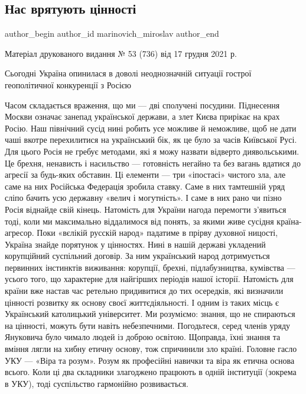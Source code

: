  
 
 
 
 
\subsection{Нас врятують цінності}
\label{sec:31_12_2021.stz.news.ua.tyzhden.1.cennosti}


\ifcmt
 author_begin
   author_id marinovich_miroslav
 author_end
\fi

Матеріал друкованого видання № 53 (736) від 17 грудня 2021 р.

\begin{zznagolos}
Сьогодні Україна опинилася в доволі неоднозначній ситуації гострої
геополітичної конкуренції з Росією
\end{zznagolos}

Часом складається враження, що ми — дві сполучені посудини. Піднесення Москви
означає занепад української держави, а злет Києва прирікає на крах Росію. Наш
північний сусід нині робить усе можливе й неможливе, щоб не дати чаші вкотре
перехилитися на український бік, як це було за часів Київської Русі. Для цього
Росія не гребує методами, які я можу назвати відверто диявольськими. Це брехня,
ненависть і насильство — готовність негайно та без вагань вдатися до агресії за
будь-яких обставин. Ці елементи — три «іпостасі» чистого зла, але саме на них
Російська Федерація зробила ставку. Саме в них тамтешній уряд сліпо бачить усю
державну «велич і могутність». І саме в них рано чи пізно Росія віднайде свій
кінець. Натомість для України нагода перемогти з’явиться тоді, коли ми
максимально віддалимося від понять, за якими живе сусідня країна-агресор. Поки
«вєлікій русскій народ» падатиме в прірву духовної ницості, Україна знайде
порятунок у цінностях. Нині в нашій державі укладений корупційний суспільний
договір. За ним український народ дотримується первинних інстинктів виживання:
корупції, брехні, підлабузництва, кумівства — усього того, що характерне для
найгірших періодів нашої історії. Натомість для країни вже настав час ретельно
придивитися до тих осередків, які визначили цінності розвитку як основу своєї
життєдіяльності. І одним із таких місць є Український католицький університет.
Ми розуміємо: знання, що не спираються на цінності, можуть бути навіть
небезпечними. Погодьтеся, серед членів уряду Януковича було чимало людей із
доброю освітою. Щоправда, їхні знання та вміння лягли на хибну етичну основу,
тож спричинили зло країні. Головне гасло УКУ — «Віра та розум». Розум як
професійні навички та віра як етична основа всього. Коли ці два складники
злагоджено працюють в одній інституції (зокрема в УКУ), тоді суспільство
гармонійно розвивається.

